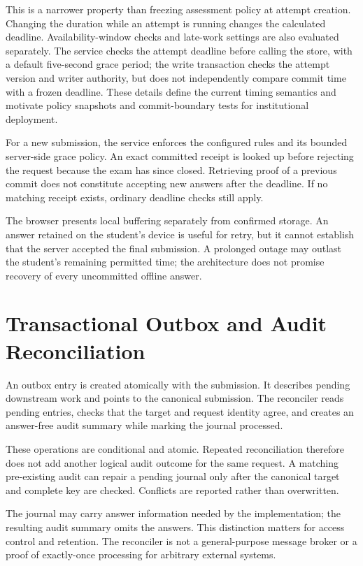 This is a narrower property than freezing assessment policy at attempt creation. Changing the duration while an attempt is running changes the calculated deadline. Availability-window checks and late-work settings are also evaluated separately. The service checks the attempt deadline before calling the store, with a default five-second grace period; the write transaction checks the attempt version and writer authority, but does not independently compare commit time with a frozen deadline. These details define the current timing semantics and motivate policy snapshots and commit-boundary tests for institutional deployment.

For a new submission, the service enforces the configured rules and its bounded server-side grace policy. An exact committed receipt is looked up before rejecting the request because the exam has since closed. Retrieving proof of a previous commit does not constitute accepting new answers after the deadline. If no matching receipt exists, ordinary deadline checks still apply.

The browser presents local buffering separately from confirmed storage. An answer retained on the student's device is useful for retry, but it cannot establish that the server accepted the final submission. A prolonged outage may outlast the student's remaining permitted time; the architecture does not promise recovery of every uncommitted offline answer.
\section{Transactional Outbox and Audit Reconciliation}
An outbox entry is created atomically with the submission. It describes pending downstream work and points to the canonical submission. The reconciler reads pending entries, checks that the target and request identity agree, and creates an answer-free audit summary while marking the journal processed.

These operations are conditional and atomic. Repeated reconciliation therefore does not add another logical audit outcome for the same request. A matching pre-existing audit can repair a pending journal only after the canonical target and complete key are checked. Conflicts are reported rather than overwritten.

The journal may carry answer information needed by the implementation; the resulting audit summary omits the answers. This distinction matters for access control and retention. The reconciler is not a general-purpose message broker or a proof of exactly-once processing for arbitrary external systems.

